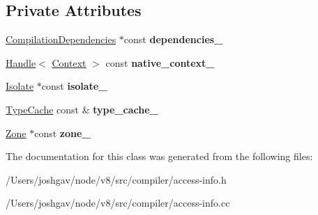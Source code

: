 \subsection*{Private Attributes}
\begin{DoxyCompactItemize}
\item 
\hyperlink{classv8_1_1internal_1_1_compilation_dependencies}{Compilation\+Dependencies} $\ast$const {\bfseries dependencies\+\_\+}\hypertarget{classv8_1_1internal_1_1compiler_1_1_access_info_factory_a40431c52616f5ab622a3f6ee1505a5d6}{}\label{classv8_1_1internal_1_1compiler_1_1_access_info_factory_a40431c52616f5ab622a3f6ee1505a5d6}

\item 
\hyperlink{classv8_1_1internal_1_1_handle}{Handle}$<$ \hyperlink{classv8_1_1internal_1_1_context}{Context} $>$ const {\bfseries native\+\_\+context\+\_\+}\hypertarget{classv8_1_1internal_1_1compiler_1_1_access_info_factory_a646063a9300faf25ac27ba61181f4e17}{}\label{classv8_1_1internal_1_1compiler_1_1_access_info_factory_a646063a9300faf25ac27ba61181f4e17}

\item 
\hyperlink{classv8_1_1internal_1_1_isolate}{Isolate} $\ast$const {\bfseries isolate\+\_\+}\hypertarget{classv8_1_1internal_1_1compiler_1_1_access_info_factory_a59312ab517b84bc8755373307473249b}{}\label{classv8_1_1internal_1_1compiler_1_1_access_info_factory_a59312ab517b84bc8755373307473249b}

\item 
\hyperlink{classv8_1_1internal_1_1_type_cache}{Type\+Cache} const \& {\bfseries type\+\_\+cache\+\_\+}\hypertarget{classv8_1_1internal_1_1compiler_1_1_access_info_factory_ac1417e678c5bdaa0fdf19888cb551236}{}\label{classv8_1_1internal_1_1compiler_1_1_access_info_factory_ac1417e678c5bdaa0fdf19888cb551236}

\item 
\hyperlink{classv8_1_1internal_1_1_zone}{Zone} $\ast$const {\bfseries zone\+\_\+}\hypertarget{classv8_1_1internal_1_1compiler_1_1_access_info_factory_a0b2cd82eee5d3dd62c56b47ff1f0e144}{}\label{classv8_1_1internal_1_1compiler_1_1_access_info_factory_a0b2cd82eee5d3dd62c56b47ff1f0e144}

\end{DoxyCompactItemize}


The documentation for this class was generated from the following files\+:\begin{DoxyCompactItemize}
\item 
/\+Users/joshgav/node/v8/src/compiler/access-\/info.\+h\item 
/\+Users/joshgav/node/v8/src/compiler/access-\/info.\+cc\end{DoxyCompactItemize}
